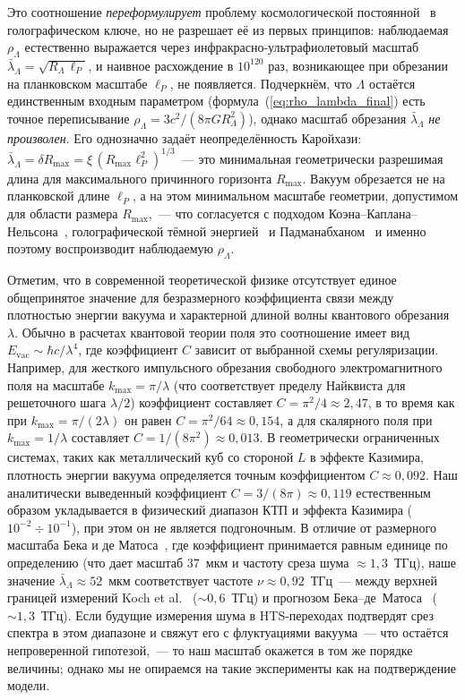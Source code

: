 \documentclass[12pt,a4paper]{article}
\begin{document}
Это соотношение \emph{переформулирует} проблему космологической постоянной~\cite{Weinberg1989} в голографическом ключе, но не разрешает её из первых принципов: наблюдаемая $\rho_\Lambda$ естественно выражается через инфракрасно-ультрафиолетовый масштаб $\bar\lambda_\Lambda = \sqrt{R_\Lambda\,\ell_P}$, и наивное расхождение в $10^{120}$ раз, возникающее при обрезании на планковском масштабе $\ell_P$, не появляется. Подчеркнём, что $\Lambda$ остаётся единственным входным параметром (формула~(\ref{eq:rho_lambda_final}) есть точное переписывание $\rho_\Lambda = 3c^2/(8\pi G R_\Lambda^2)$), однако масштаб обрезания $\bar\lambda_\Lambda$ \emph{не произволен}. Его однозначно задаёт неопределённость Каройхази: $\bar\lambda_\Lambda = \delta R_{\max} = \xi\,(R_{\max}\ell_P^2)^{1/3}$~--- это минимальная геометрически разрешимая длина для максимального причинного горизонта $R_{\max}$. Вакуум обрезается не на планковской длине $\ell_P$, а на этом минимальном масштабе геометрии, допустимом для области размера $R_{\max}$,~--- что согласуется с подходом Коэна--Каплана--Нельсона~\cite{Cohen1999}, голографической тёмной энергией~\cite{Li2004,WangWangLi2017} и Падманабханом~\cite{Padmanabhan2005} и именно поэтому воспроизводит наблюдаемую $\rho_\Lambda$.

Отметим, что в современной теоретической физике отсутствует единое общепринятое значение для безразмерного коэффициента связи между плотностью энергии вакуума и характерной длиной волны квантового обрезания $\lambda$. Обычно в расчетах квантовой теории поля это соотношение имеет вид $E_{\text{vac}} \sim \hbar c / \lambda^4$, где коэффициент $C$ зависит от выбранной схемы регуляризации. Например, для жесткого импульсного обрезания свободного электромагнитного поля на масштабе $k_{\text{max}} = \pi/\lambda$ (что соответствует пределу Найквиста для решеточного шага $\lambda/2$) коэффициент составляет $C = \pi^2/4 \approx 2{,}47$, в то время как при $k_{\text{max}} = \pi/(2\lambda)$ он равен $C = \pi^2/64 \approx 0{,}154$, а для скалярного поля при $k_{\text{max}} = 1/\lambda$ составляет $C = 1/(8\pi^2) \approx 0{,}013$. В геометрически ограниченных системах, таких как металлический куб со стороной $L$ в эффекте Казимира, плотность энергии вакуума определяется точным коэффициентом $C \approx 0{,}092$. Наш аналитически выведенный коэффициент $C = 3/(8\pi) \approx 0{,}119$ естественным образом укладывается в физический диапазон КТП и эффекта Казимира ($10^{-2} \div 10^{-1}$), при этом он не является подгоночным. В отличие от размерного масштаба Бека и де Матоса~\cite{Beck2007}, где коэффициент принимается равным единице по определению (что дает масштаб $37$~мкм и частоту среза шума $\approx 1{,}3$~ТГц), наше значение $\bar\lambda_\Lambda \approx 52$~мкм соответствует частоте $\nu \approx 0{,}92$~ТГц~--- между верхней границей измерений Koch et al.~\cite{Koch1982} ($\sim0{,}6$~ТГц) и прогнозом Бека--де~Матоса~\cite{Beck2007} ($\sim1{,}3$~ТГц). Если будущие измерения шума в HTS-переходах подтвердят срез спектра в этом диапазоне и свяжут его с флуктуациями вакуума~--- что остаётся непроверенной гипотезой,~--- то наш масштаб окажется в том же порядке величины; однако мы не опираемся на такие эксперименты как на подтверждение модели.
\end{document}
